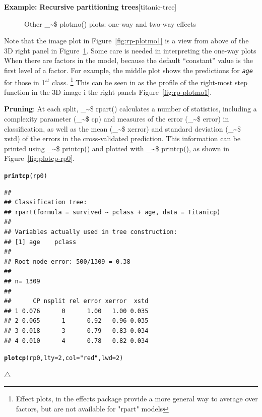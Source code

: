 \documentclass{article}
\makeatletter
\newcommand{\hlnum}[1]{\textcolor[rgb]{0.686,0.059,0.569}{#1}}%
\newcommand{\hlstr}[1]{\textcolor[rgb]{0.192,0.494,0.8}{#1}}%
\newcommand{\hlstd}[1]{\textcolor[rgb]{0.345,0.345,0.345}{#1}}%
\newcommand{\hlkwc}[1]{\textcolor[rgb]{0.333,0.667,0.333}{#1}}%
\newcommand{\hlkwd}[1]{\textcolor[rgb]{0.737,0.353,0.396}{\textbf{#1}}}%
\newenvironment{kframe}{%
 \def\at@end@of@kframe{}%
 \ifinner\ifhmode%
  \def\at@end@of@kframe{\end{minipage}}%
  \begin{minipage}{\columnwidth}%
 \fi\fi%
 \def\FrameCommand##1{\hskip\@totalleftmargin \hskip-\fboxsep
 \colorbox{shadecolor}{##1}\hskip-\fboxsep
     \hskip-\linewidth \hskip-\@totalleftmargin \hskip\columnwidth}%
 \MakeFramed {\advance\hsize-\width
   \@totalleftmargin\z@ \linewidth\hsize
   \@setminipage}}%
 {\par\unskip\endMakeFramed%
 \at@end@of@kframe}
\newenvironment{knitrout}{}{} %
\newcommand{\figref}[1]{Figure~\ref{#1}}
\newcommand{\var}[1]{\textit{\texttt{#1}}}
\newcommand{\class}[1]{\textsf{"#1"}}
\newcommand\code{\bgroup\@makeother\_\@makeother\~\@makeother\$\@codex}
\def\@codex#1{{\normalfont\ttfamily\hyphenchar\font=-1 #1}\egroup}
\newcommand{\func}[1]{\code{#1()}}
\newcommand{\pkg}[1]{\textsf{#1}\nocite{R-#1}}
\newcommand{\Rpackage}[1]{\pkg{#1} package}
\newenvironment{Example}[2][unnamed-example]%
  {\medskip\noindent\textbf{\textsf{Example:}}
   \textbf{#2}\hfill [#1]\par\smallskip
  }
  {\hfill $\triangle$}
\makeatother
\begin{document}
\begin{Example}[titanic-tree]{Recursive partitioning trees}
\begin{knitrout}
\begin{figure}[hbt!]
{}

\caption[Other \func{plotmo} plots]{Other \func{plotmo} plots: one-way and two-way effects\label{fig:rp-plotmo2}}
\end{figure}


\end{knitrout}

Note that the image plot in \figref{fig:rp-plotmo1} is a view from above of the
3D right panel in \figref{fig:rp-plotmo2}. Some care is needed in interpreting the
one-way plots When there are factors in the model, because the default
``constant'' value is the first level of a factor.
For example, the middle plot shows the predictions for \var{age} for those
in 1$^{st}$ class.%
\footnote{
Effect plots, in the \Rpackage{effects} provide a more general way to average
over factors, but are not available for \class{rpart} models
}
This can be seen in as the profile of the right-most 
step function in the 3D image i the right panels \figref{fig:rp-plotmo1}.

\noindent\textbf{Pruning}:
At each split, \func{rpart} calculates a number of statistics, including
a complexity parameter (\code{cp}) and measures of the error (\code{error}) 
in classification,
as well as the mean (\code{xerror}) and standard deviation (\code{xstd})
of the errors in the cross-validated prediction.
This information can be printed using \func{printcp} and plotted with \func{printcp},
as shown in \figref{fig:plotcp-rp0}.
\begin{knitrout}
\color{fgcolor}\begin{kframe}
\begin{alltt}
\hlkwd{printcp}\hlstd{(rp0)}
\end{alltt}
\begin{verbatim}
## 
## Classification tree:
## rpart(formula = survived ~ pclass + age, data = Titanicp)
## 
## Variables actually used in tree construction:
## [1] age    pclass
## 
## Root node error: 500/1309 = 0.38
## 
## n= 1309 
## 
##      CP nsplit rel error xerror  xstd
## 1 0.076      0      1.00   1.00 0.035
## 2 0.065      1      0.92   0.96 0.035
## 3 0.018      3      0.79   0.83 0.034
## 4 0.010      4      0.78   0.82 0.034
\end{verbatim}
\end{kframe}
\end{knitrout}

\begin{knitrout}
\color{fgcolor}\begin{kframe}
\begin{alltt}
\hlkwd{plotcp}\hlstd{(rp0,} \hlkwc{lty}\hlstd{=}\hlnum{2}\hlstd{,} \hlkwc{col}\hlstd{=}\hlstr{"red"}\hlstd{,} \hlkwc{lwd}\hlstd{=}\hlnum{2}\hlstd{)}
\end{alltt}
\end{kframe}\begin{figure}[hbt!]



\end{figure}
\end{knitrout}
\end{Example}
\end{document}
